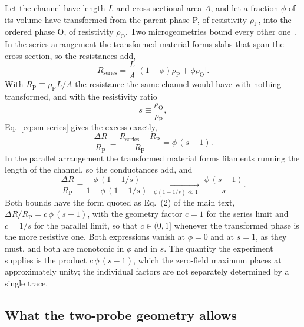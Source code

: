 \documentclass[reprint,twocolumn,prb,amsmath,amssymb,superscriptaddress,floatfix]{revtex4-2}
\begin{document}
Let the channel have length $L$ and cross-sectional area $A$, and let a fraction $\phi$ of its
volume have transformed from the parent phase P, of resistivity $\rho_{\mathrm{P}}$, into the
ordered phase O, of resistivity $\rho_{\mathrm{O}}$. Two microgeometries bound every other
one~\cite{Wiener1912,Milton2002}. In the series arrangement the transformed material forms slabs that span
the cross section, so the resistances add,
\begin{equation}
  R_{\mathrm{series}} = \frac{L}{A}\bigl[(1-\phi)\rho_{\mathrm{P}}+\phi\rho_{\mathrm{O}}\bigr].
  \label{eq:sm-series}
\end{equation}
With $R_{\mathrm{P}}\equiv\rho_{\mathrm{P}}L/A$ the resistance the same channel would have with
nothing transformed, and with the resistivity ratio
\begin{equation}
  s \equiv \frac{\rho_{\mathrm{O}}}{\rho_{\mathrm{P}}},
  \label{eq:sm-sdef}
\end{equation}
Eq.~\eqref{eq:sm-series} gives the excess exactly,
\begin{equation}
  \frac{\Delta R}{R_{\mathrm{P}}}
  \equiv \frac{R_{\mathrm{series}}-R_{\mathrm{P}}}{R_{\mathrm{P}}}
  = \phi\,(s-1).
  \label{eq:sm-seriesexcess}
\end{equation}
In the parallel arrangement the transformed material forms filaments running the length of the
channel, so the conductances add, and
\begin{equation}
  \frac{\Delta R}{R_{\mathrm{P}}}
  = \frac{\phi\,(1-1/s)}{1-\phi\,(1-1/s)}
  \;\xrightarrow[\ \phi(1-1/s)\ll1\ ]{}\;
  \frac{\phi\,(s-1)}{s}.
  \label{eq:sm-parallel}
\end{equation}
Both bounds have the form quoted as Eq.~(2) of the main text,
$\Delta R/R_{\mathrm{P}}=c\,\phi\,(s-1)$, with the geometry factor $c=1$ for the series limit
and $c=1/s$ for the parallel limit, so that $c\in(0,1]$ whenever the transformed phase is the
more resistive one. Both expressions vanish at $\phi=0$ and at $s=1$, as they must, and both are
monotonic in $\phi$ and in $s$. The quantity the experiment supplies is the product
$c\,\phi\,(s-1)$, which the zero-field maximum places at approximately unity; the individual
factors are not separately determined by a single trace.

\subsection{What the two-probe geometry allows}
\end{document}
